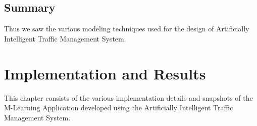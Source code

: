\documentclass[openany,12pt]{report}
\begin{document}

\section{Summary}
\hspace*{0.5in}Thus we saw the various modeling techniques used for the design of Artificially Intelligent Traffic Management System.

\chapter{Implementation and Results}
\hspace*{0.5in}This chapter consists of the various implementation details and snapshots of the M-Learning Application developed using the Artificially Intelligent Traffic Management System.
\end{document}
